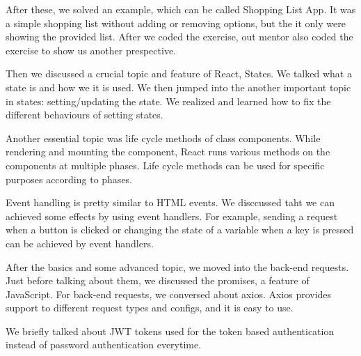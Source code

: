 After these, we solved an example, which can be called Shopping List App. It was a simple shopping list without adding or removing options, but the it only were showing the provided list. After we coded the exercise, out mentor also coded the exercise to show us another prespective.


Then we discussed a crucial topic and feature of React, States. We talked what a state is and how we it is used. We then jumped into the another important topic in states: setting/updating the state. We realized and learned how to fix the different behaviours of setting states.

Another essential topic was life cycle methods of class components. While rendering and mounting the component, React runs various methods on the components at multiple phases. Life cycle methods can be used for specific purposes according to phases.

Event handling is pretty similar to HTML events. We disccussed taht we can achieved some effects by using event handlers. For example, sending a request when a button is clicked or changing the state of a variable when a key is pressed can be achieved by event handlers.

After the basics and some advanced topic, we moved into the back-end requests. Just before talking about them, we discussed the promises, a feature of JavaScript. For back-end requests, we conversed about axios. Axios provides support to different request types and configs, and it is easy to use.

We briefly talked about JWT tokens used for the token based authentication instead of password authentication everytime.





